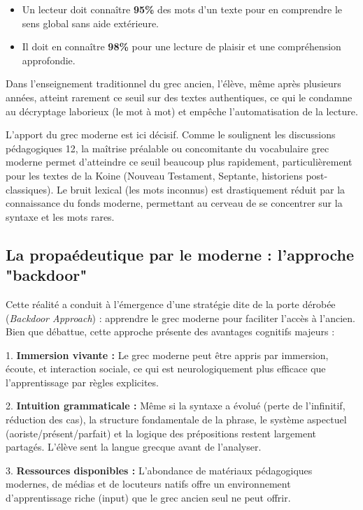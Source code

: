 \begin{itemize}\item Un lecteur doit connaître \textbf{95\%} des mots d'un texte pour en comprendre le sens global sans aide extérieure.\item Il doit en connaître \textbf{98\%} pour une lecture de plaisir et une compréhension approfondie.\end{itemize}Dans l'enseignement traditionnel du grec ancien, l'élève, même après plusieurs années, atteint
rarement ce seuil sur des textes authentiques, ce qui le condamne au décryptage laborieux (le \og
mot à mot\fg{}) et empêche l'automatisation de la lecture.

L'apport du grec moderne est ici décisif. Comme le soulignent les discussions pédagogiques 12, la
maîtrise préalable ou concomitante du vocabulaire grec moderne permet d'atteindre ce seuil beaucoup
plus rapidement, particulièrement pour les textes de la Koine (Nouveau Testament, Septante,
historiens post-classiques). Le \og bruit\fg{} lexical (les mots inconnus) est drastiquement réduit
par la connaissance du fonds moderne, permettant au cerveau de se concentrer sur la syntaxe et les
mots rares.



\subsection{La propaédeutique par le moderne : l'approche "backdoor"}

Cette réalité a conduit à l'émergence d'une stratégie dite de la \og porte dérobée\fg{}
(\textit{Backdoor Approach}) : apprendre le grec moderne pour faciliter l'accès à
l'ancien.\cite{ref21} Bien que débattue, cette approche présente des avantages cognitifs majeurs :

1. \textbf{Immersion vivante :} Le grec moderne peut être appris par immersion, écoute, et
interaction sociale, ce qui est neurologiquement plus efficace que l'apprentissage par règles
explicites.

2. \textbf{Intuition grammaticale :} Même si la syntaxe a évolué (perte de l'infinitif, réduction
des cas), la structure fondamentale de la phrase, le système aspectuel (aoriste/présent/parfait) et
la logique des prépositions restent largement partagés.\cite{ref24} L'élève \og sent\fg{} la langue
grecque avant de l'analyser.

3. \textbf{Ressources disponibles :} L'abondance de matériaux pédagogiques modernes, de médias et de
locuteurs natifs offre un environnement d'apprentissage riche (\og input\fg{}) que le grec ancien
seul ne peut offrir.



